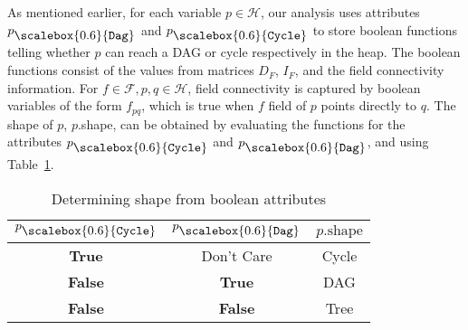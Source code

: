 \documentclass{sig-alternate}
\newcommand{\p}{\ensuremath{p}}
\newcommand{\q}{\ensuremath{q}}
\newcommand{\heap}{\ensuremath{\mathcal{H}}}
\newcommand{\fields}{\ensuremath{\mathcal{F}}}
\newcommand{\shape}{\mbox{shape}}
\newcommand{\subC}{\mbox{\scalebox{0.6}{\Cycle}}}
\newcommand{\subD}{\mbox{\scalebox{0.6}{\Dag}}}
\newcommand{\Dag}{{\tt Dag}}
\newcommand{\Cycle}{{\tt Cycle}}
\newcommand{\false}{\textbf{False}}
\newcommand{\true}{\textbf{True}}
\begin{document}
As mentioned earlier, for each variable $\p \in \heap$, our
analysis uses attributes $\p_{\subD}$ and $\p_{\subC}$ to
store boolean functions telling whether $\p$ can reach a DAG or
cycle respectively in the heap. The boolean functions
consist of the values from matrices $D_F$, $I_F$, and the field
connectivity information. For $f \in \fields, \p, \q \in
\heap$, field connectivity is captured by boolean variables
of the form $f_{pq}$, which is true when $f$ field of $\p$ points
directly to $\q$. 
The shape of \p, \p.\shape, can be obtained by evaluating
the functions for the attributes $\p_{\subC}$ and
$\p_{\subD}$, and using Table~\ref{tbl:det_shape}.
\begin{table}
\caption{Determining shape from boolean
  attributes\label{tbl:det_shape}}
\begin{center}
\begin{tabular}{|c|c|c|}
\hline
$\p_{\subC}$ & $\p_{\subD}$ & $\p.\shape$ \\ 
\hline
\true  & Don't Care  & Cycle        \\ 
\false  & \true          & DAG    \\ 
\false  & \false          & Tree   \\ 
\hline
\end{tabular}
\end{center}
\end{table}
\end{document}
